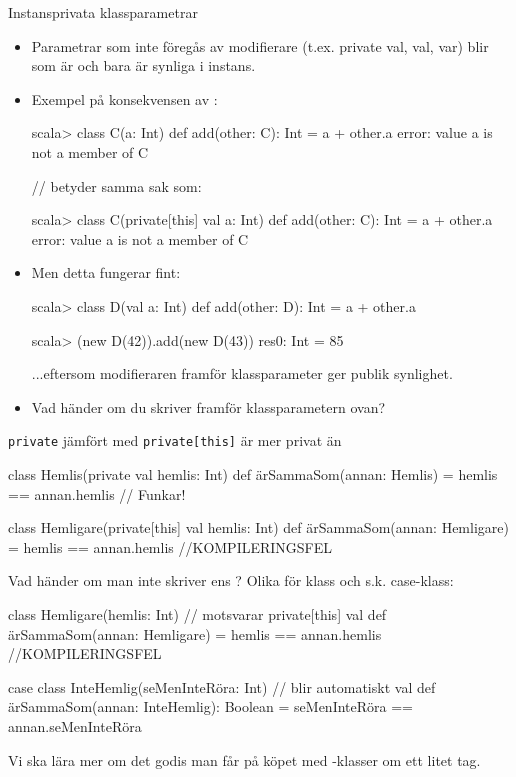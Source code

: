 \begin{Slide}{Instansprivata klassparametrar}\SlideFontSmall
\setlength{\leftmargini}{0pt}

\begin{itemize}
\item Parametrar som inte föregås av modifierare (t.ex. private val, val, var) blir  som är  och bara är synliga i  instans.
\item Exempel på konsekvensen av :
\begin{REPL}[basicstyle=\SlideFontSize{6.7}{9}\ttfamily\color{white}]
scala> class C(a: Int){ def add(other: C): Int = a + other.a }
error: value a is not a member of C

// betyder samma sak som:

scala> class C(private[this] val a: Int){ def add(other: C): Int = a + other.a }
error: value a is not a member of C
\end{REPL}
\item Men detta fungerar fint:
\begin{REPL}
scala> class D(val a: Int){ def add(other: D): Int = a + other.a }

scala> (new D(42)).add(new D(43))
res0: Int = 85
\end{REPL}
...eftersom modifieraren  framför klassparameter ger publik synlighet.
\item Vad händer om du skriver  framför klassparametern  ovan?
\end{itemize}
\end{Slide}


\begin{Slide}{\texttt{private} jämfört med \texttt{private[this]}}\SlideFontSmall
{} är  mer privat än 
\begin{Code}
class Hemlis(private val hemlis: Int) {
  def ärSammaSom(annan: Hemlis) = hemlis == annan.hemlis   // Funkar!
}

class Hemligare(private[this] val hemlis: Int) {
  def ärSammaSom(annan: Hemligare) = hemlis == annan.hemlis //KOMPILERINGSFEL
}
\end{Code}
\pause Vad händer om man inte skriver ens ? \pause Olika för klass och s.k. case-klass:
\begin{Code}
class Hemligare(hemlis: Int) { // motsvarar private[this] val
  def ärSammaSom(annan: Hemligare) = hemlis == annan.hemlis //KOMPILERINGSFEL
}

case class InteHemlig(seMenInteRöra: Int) { // blir automatiskt val
  def ärSammaSom(annan: InteHemlig): Boolean =
    seMenInteRöra == annan.seMenInteRöra
}

\end{Code}
{\SlideFontTiny Vi ska lära mer om det godis man får på köpet med -klasser om ett litet tag.}
\end{Slide}



